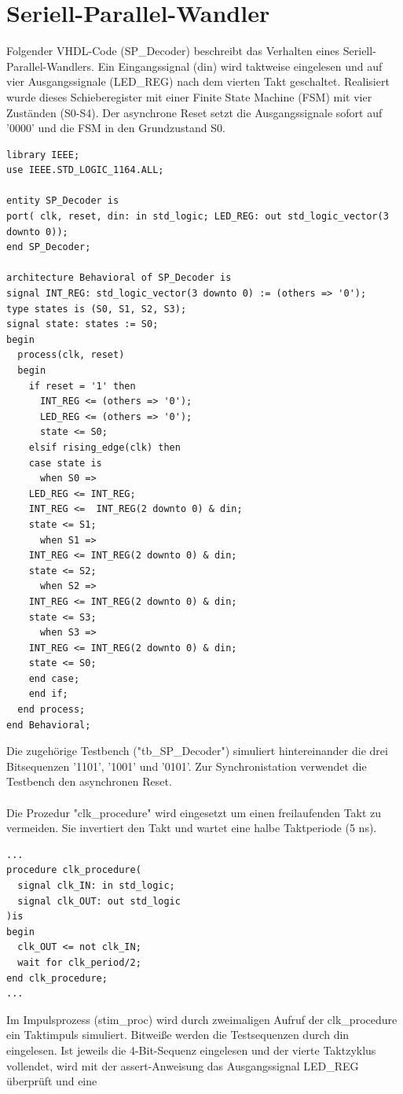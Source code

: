 \documentclass{article}
\newcommand{\enterProblemHeader}[1]{
}
\newcommand{\exitProblemHeader}[1]{
}
\newcounter{homeworkProblemCounter} %
\newcommand{\homeworkProblemName}{}
\newenvironment{homeworkProblem}[1][Problem \arabic{homeworkProblemCounter}]{ %
\stepcounter{homeworkProblemCounter} %
\renewcommand{\homeworkProblemName}{#1} %
\section{\homeworkProblemName} %
\enterProblemHeader{\homeworkProblemName} %
}{
\exitProblemHeader{\homeworkProblemName} %
}
\begin{document}
\begin{homeworkProblem}[Seriell-Parallel-Wandler]
Folgender VHDL-Code (SP\_Decoder) beschreibt das Verhalten eines Seriell-Parallel-Wandlers. 
Ein Eingangssignal (din) wird taktweise eingelesen und auf vier Ausgangssignale 
(LED\_REG) nach dem vierten Takt geschaltet. Realisiert wurde dieses Schieberegister
mit einer Finite State Machine (FSM) mit vier Zuständen (S0-S4). Der asynchrone 
Reset setzt die Ausgangssignale sofort auf '0000' und die FSM in den Grundzustand S0.
\begin{verbatim}
library IEEE;
use IEEE.STD_LOGIC_1164.ALL;

entity SP_Decoder is
port( clk, reset, din: in std_logic; LED_REG: out std_logic_vector(3 downto 0));
end SP_Decoder;

architecture Behavioral of SP_Decoder is
signal INT_REG: std_logic_vector(3 downto 0) := (others => '0');
type states is (S0, S1, S2, S3);
signal state: states := S0;
begin
  process(clk, reset)
  begin
    if reset = '1' then 
      INT_REG <= (others => '0');
      LED_REG <= (others => '0');
      state <= S0;
    elsif rising_edge(clk) then
    case state is
      when S0 =>
	LED_REG <= INT_REG;
	INT_REG <=  INT_REG(2 downto 0) & din;
	state <= S1;
      when S1 =>
	INT_REG <= INT_REG(2 downto 0) & din;
	state <= S2;
      when S2 =>
	INT_REG <= INT_REG(2 downto 0) & din;
	state <= S3;
      when S3 =>
	INT_REG <= INT_REG(2 downto 0) & din;
	state <= S0;
    end case;
    end if;
  end process;
end Behavioral;
\end{verbatim}
Die zugehörige Testbench ("tb\_SP\_Decoder") simuliert hintereinander die drei 
Bitsequenzen '1101', '1001' und '0101'. Zur Synchronistation verwendet die 
Testbench den asynchronen Reset.
\\\\
Die Prozedur "clk\_procedure" wird eingesetzt um einen freilaufenden Takt zu
vermeiden. Sie invertiert den Takt und wartet eine halbe Taktperiode (5 ns).
\begin{verbatim}
...
procedure clk_procedure(
  signal clk_IN: in std_logic;
  signal clk_OUT: out std_logic
)is
begin
  clk_OUT <= not clk_IN;
  wait for clk_period/2;
end clk_procedure;
...
\end{verbatim}
Im Impulsprozess (stim\_proc) wird durch zweimaligen Aufruf der clk\_procedure
ein Taktimpuls simuliert. Bitweiße werden die Testsequenzen durch din eingelesen.
Ist jeweils die 4-Bit-Sequenz eingelesen und der vierte Taktzyklus vollendet,
wird mit der assert-Anweisung das Ausgangssignal LED\_REG überprüft und eine

\end{homeworkProblem}
\end{document}
